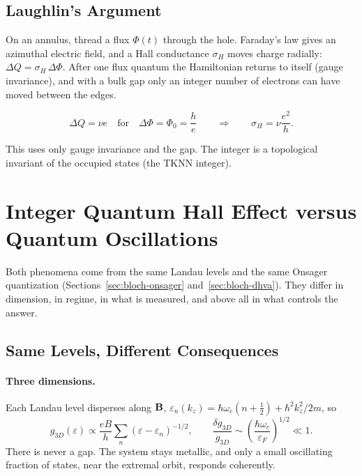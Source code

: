 \subsection{Laughlin's Argument}

On an annulus, thread a flux $\Phi(t)$ through the hole. Faraday's law gives an azimuthal electric field, and a Hall conductance $\sigma_H$ moves charge radially: $\Delta Q = \sigma_H\,\Delta\Phi$. After one flux quantum the Hamiltonian returns to itself (gauge invariance), and with a bulk gap only an integer number of electrons can have moved between the edges.

\begin{theorem}[Laughlin]
\begin{equation}
    \Delta Q = \nu e\quad\text{for}\quad\Delta\Phi = \Phi_0 = \frac he
    \qquad\Longrightarrow\qquad
    \sigma_H = \nu\frac{e^2}{h}.
\end{equation}
\end{theorem}

This uses only gauge invariance and the gap. The integer is a topological invariant of the occupied states (the TKNN integer).

\section{Integer Quantum Hall Effect versus Quantum Oscillations}

Both phenomena come from the same Landau levels and the same Onsager quantization (Sections~\ref{sec:bloch-onsager} and~\ref{sec:bloch-dhva}). They differ in dimension, in regime, in what is measured, and above all in what controls the answer.

\subsection{Same Levels, Different Consequences}

\paragraph{Three dimensions.} Each Landau level disperses along $\cvect{B}$, $\varepsilon_n(k_z) = \hbar\omega_c(n+\tfrac12) + \hbar^2k_z^2/2m$, so
\begin{equation}
    g_{3D}(\varepsilon) \propto \frac{eB}{h}\sum_n(\varepsilon-\varepsilon_n)^{-1/2},
    \qquad
    \frac{\delta g_{3D}}{g_{3D}} \sim \left(\frac{\hbar\omega_c}{\varepsilon_F}\right)^{1/2} \ll 1.
\end{equation}
There is never a gap. The system stays metallic, and only a small oscillating fraction of states, near the extremal orbit, responds coherently.

